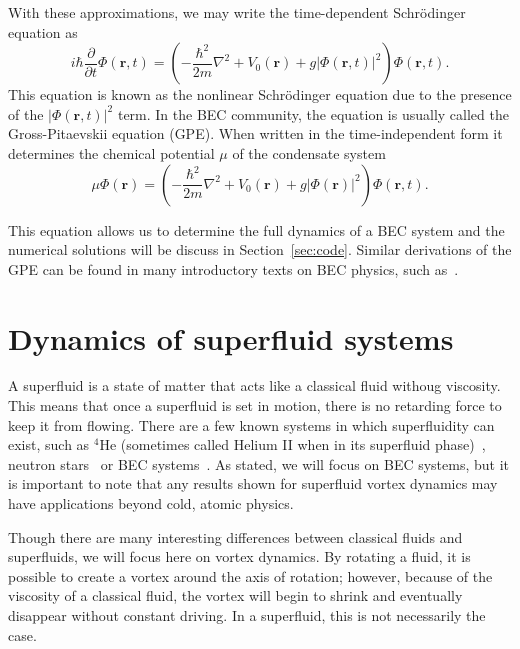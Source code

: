 With these approximations, we may write the time-dependent Schr\"odinger equation as
\begin{equation}
    i\hbar \frac{\partial}{\partial t}\Phi(\mathbf{r},t) = \left( - \frac{\hbar^2}{2m} \nabla^2 + V_0(\mathbf{r}) + g |\Phi(\mathbf{r},t)|^2\right)\Phi(\mathbf{r},t).
\end{equation}
This equation is known as the nonlinear Schr\"odinger equation due to the presence of the $|\Phi(\mathbf{r},t)|^2$ term.
In the BEC community, the equation is usually called the Gross-Pitaevskii equation (GPE).
When written in the time-independent form it determines the chemical potential $\mu$ of the condensate system~\cite{Gross1961, Pitaevskii1961}
\begin{equation}
    \mu\Phi(\mathbf{r}) = \left( - \frac{\hbar^2}{2m} \nabla^2 + V_0(\mathbf{r}) + g |\Phi(\mathbf{r})|^2\right)\Phi(\mathbf{r},t).
    \label{eqn:GP}
\end{equation}

This equation allows us to determine the full dynamics of a BEC system and the numerical solutions will be discuss in Section~\ref{sec:code}. Similar derivations of the GPE can be found in many introductory texts on BEC physics, such as~\cite{Fetter2003,  Pethick2002, Fetter2009}.

\section{Dynamics of superfluid systems}
\label{sec"superfluid}

A superfluid is a state of matter that acts like a classical fluid withoug viscosity.
This means that once a superfluid is set in motion, there is no retarding force to keep it from flowing.
There are a few known systems in which superfluidity can exist, such as $^4$He (sometimes called Helium II when in its superfluid phase)~\cite{Allen1938}, neutron stars~\cite{Migdal1960} or BEC systems~\cite{Einstein1925, Anderson1995}.
As stated, we will focus on BEC systems, but it is important to note that any results shown for superfluid vortex dynamics may have applications beyond cold, atomic physics.

Though there are many interesting differences between classical fluids and superfluids, we will focus here on vortex dynamics.
By rotating a fluid, it is possible to create a vortex around the axis of rotation; however, because of the viscosity of a classical fluid, the vortex will begin to shrink and eventually disappear without constant driving.
In a superfluid, this is not necessarily the case.

